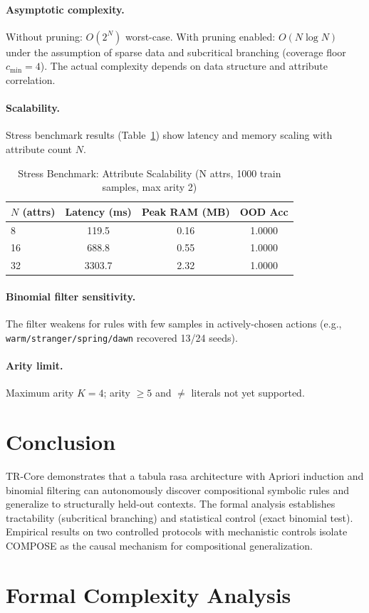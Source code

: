 \documentclass[11pt]{article}
\begin{document}
\paragraph{Asymptotic complexity.} Without pruning: $O(2^N)$ worst-case. With pruning enabled: $O(N \log N)$ under the assumption of sparse data and subcritical branching (coverage floor $c_{\min}=4$). The actual complexity depends on data structure and attribute correlation.

\paragraph{Scalability.} Stress benchmark results (Table~\ref{tab:stress}) show latency and memory scaling with attribute count $N$.

\begin{table}[htbp]
\centering
\caption{Stress Benchmark: Attribute Scalability (N attrs, 1000 train samples, max arity 2)}
\label{tab:stress}
\begin{tabular}{lccc}
\toprule
$N$ (attrs) & Latency (ms) & Peak RAM (MB) & OOD Acc \\
\midrule
8 & 119.5 & 0.16 & 1.0000 \\
16 & 688.8 & 0.55 & 1.0000 \\
32 & 3303.7 & 2.32 & 1.0000 \\
\bottomrule
\end{tabular}
\end{table}

\paragraph{Binomial filter sensitivity.} The filter weakens for rules with few samples in actively-chosen actions (e.g., \texttt{warm/stranger/spring/dawn} recovered 13/24 seeds).

\paragraph{Arity limit.} Maximum arity $K=4$; arity $\geq 5$ and $\neq$ literals not yet supported.

\section{Conclusion}

TR-Core demonstrates that a tabula rasa architecture with Apriori induction and binomial filtering can autonomously discover compositional symbolic rules and generalize to structurally held-out contexts. The formal analysis establishes tractability (subcritical branching) and statistical control (exact binomial test). Empirical results on two controlled protocols with mechanistic controls isolate COMPOSE as the causal mechanism for compositional generalization.




\appendix
\section{Formal Complexity Analysis}
\label{app:formal}

\end{document}

